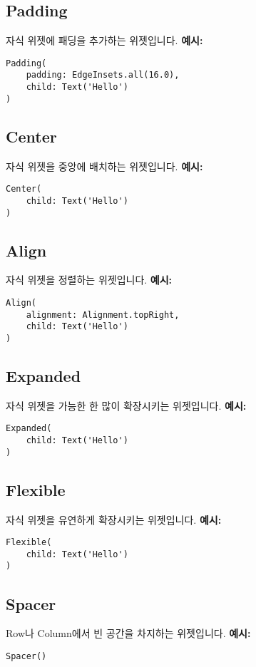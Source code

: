 \documentclass{article}
\begin{document}
\subsection*{Padding}
자식 위젯에 패딩을 추가하는 위젯입니다.
\textbf{예시:}
\begin{lstlisting}
Padding(
    padding: EdgeInsets.all(16.0),
    child: Text('Hello')
)
\end{lstlisting}

\subsection*{Center}
자식 위젯을 중앙에 배치하는 위젯입니다.
\textbf{예시:}
\begin{lstlisting}
Center(
    child: Text('Hello')
)
\end{lstlisting}

\subsection*{Align}
자식 위젯을 정렬하는 위젯입니다.
\textbf{예시:}
\begin{lstlisting}
Align(
    alignment: Alignment.topRight,
    child: Text('Hello')
)
\end{lstlisting}

\subsection*{Expanded}
자식 위젯을 가능한 한 많이 확장시키는 위젯입니다.
\textbf{예시:}
\begin{lstlisting}
Expanded(
    child: Text('Hello')
)
\end{lstlisting}

\subsection*{Flexible}
자식 위젯을 유연하게 확장시키는 위젯입니다.
\textbf{예시:}
\begin{lstlisting}
Flexible(
    child: Text('Hello')
)
\end{lstlisting}

\subsection*{Spacer}
Row나 Column에서 빈 공간을 차지하는 위젯입니다.
\textbf{예시:}
\begin{lstlisting}
Spacer()
\end{lstlisting}
\end{document}
